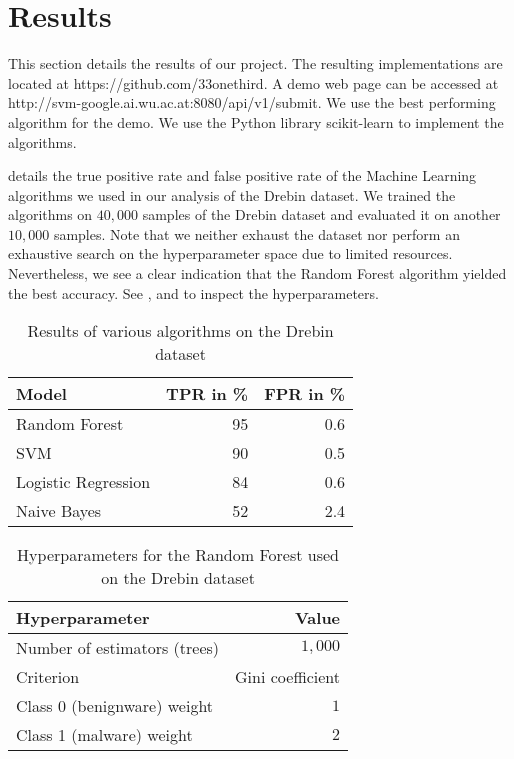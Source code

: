 \section{Results}
This section details the results of our project. The resulting implementations are located at https://github.com/33onethird. A demo web page can be accessed at http://svm-google.ai.wu.ac.at:8080/api/v1/submit. We use the best performing algorithm for the demo. We use the Python library scikit-learn \cite{scikit-learn} to implement the algorithms.

 details the true positive rate and false positive rate of the Machine Learning algorithms we used in our analysis of the Drebin dataset. We trained the algorithms on $40,000$ samples of the Drebin dataset and evaluated it on another $10,000$ samples. Note that we neither exhaust the dataset nor perform an exhaustive search on the hyperparameter space due to limited resources. Nevertheless, we see a clear indication that the Random Forest algorithm yielded the best accuracy. See ,  and  to inspect the hyperparameters.
\begin{table}[p]
	\centering
	\begin{tabular}{l r r}
		Model & TPR in \% & FPR in \%\\
		\hline
		Random Forest & 95 & 0.6\\
		SVM & 90 & 0.5\\
		Logistic Regression & 84 & 0.6\\
		Naive Bayes & 52 & 2.4\\
		\hline
	\end{tabular}
	\caption{Results of various algorithms on the Drebin dataset}
	\label{tab:resdreb}
\end{table}

\begin{table}[p]
	\centering
	\begin{tabular}{l r}
		Hyperparameter & Value \\
		\hline
		Number of estimators (trees) & $1,000$\\
		Criterion & Gini coefficient\\
		Class 0 (benignware) weight & $1$\\
		Class 1 (malware) weight & $2$\\
		\hline
	\end{tabular}
	\caption{Hyperparameters for the Random Forest used on the Drebin dataset}
	\label{tab:rfdrebin}
\end{table}

